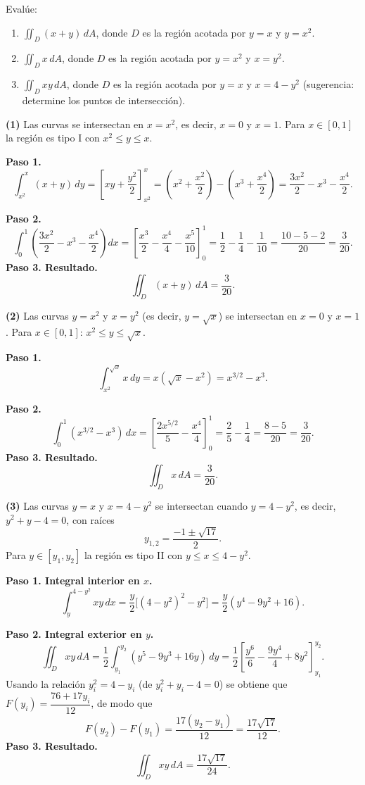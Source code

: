 \begin{prob}
Evalúe:
\begin{enumerate}
    \item $\displaystyle\iint_D (x+y)\,dA$, donde $D$ es la región acotada por $y=x$ y $y=x^2$.
    \item $\displaystyle\iint_D x\,dA$, donde $D$ es la región acotada por $y=x^2$ y $x=y^2$.
    \item $\displaystyle\iint_D xy\,dA$, donde $D$ es la región acotada por $y=x$ y $x=4-y^2$ (sugerencia: determine los puntos de intersección).
\end{enumerate}
\begin{myproof}
\textbf{(1)} Las curvas se intersectan en $x=x^2$, es decir, $x=0$ y $x=1$. Para $x\in[0,1]$ la región es tipo I con $x^2\le y\le x$.

\textbf{Paso 1.}
\[
\int_{x^2}^{x}(x+y)\,dy = \left[xy+\frac{y^2}{2}\right]_{x^2}^{x}
= \left(x^2+\frac{x^2}{2}\right)-\left(x^3+\frac{x^4}{2}\right)
= \frac{3x^2}{2}-x^3-\frac{x^4}{2}.
\]

\textbf{Paso 2.}
\[
\int_0^1\!\left(\frac{3x^2}{2}-x^3-\frac{x^4}{2}\right)dx
= \left[\frac{x^3}{2}-\frac{x^4}{4}-\frac{x^5}{10}\right]_0^1
= \frac{1}{2}-\frac{1}{4}-\frac{1}{10}
= \frac{10-5-2}{20} = \frac{3}{20}.
\]
\textbf{Paso 3. Resultado.}
\[
\boxed{\iint_D (x+y)\,dA = \frac{3}{20}.}
\]

\textbf{(2)} Las curvas $y=x^2$ y $x=y^2$ (es decir, $y=\sqrt{x}$) se intersectan en $x=0$ y $x=1$. Para $x\in[0,1]$: $x^2\le y\le\sqrt{x}$.

\textbf{Paso 1.}
\[
\int_{x^2}^{\sqrt{x}} x\,dy = x(\sqrt{x}-x^2) = x^{3/2}-x^3.
\]

\textbf{Paso 2.}
\[
\int_0^1(x^{3/2}-x^3)\,dx
= \left[\frac{2x^{5/2}}{5}-\frac{x^4}{4}\right]_0^1
= \frac{2}{5}-\frac{1}{4} = \frac{8-5}{20} = \frac{3}{20}.
\]
\textbf{Paso 3. Resultado.}
\[
\boxed{\iint_D x\,dA = \frac{3}{20}.}
\]

\textbf{(3)} Las curvas $y=x$ y $x=4-y^2$ se intersectan cuando $y=4-y^2$, es decir, $y^2+y-4=0$, con raíces
\[
y_{1,2}=\frac{-1\pm\sqrt{17}}{2}.
\]
Para $y\in[y_1,y_2]$ la región es tipo II con $y\le x\le 4-y^2$.

\textbf{Paso 1. Integral interior en $x$.}
\[
\int_{y}^{4-y^2} xy\,dx = \frac{y}{2}\bigl[(4-y^2)^2-y^2\bigr]
= \frac{y}{2}(y^4-9y^2+16).
\]

\textbf{Paso 2. Integral exterior en $y$.}
\[
\iint_D xy\,dA = \frac{1}{2}\int_{y_1}^{y_2}(y^5-9y^3+16y)\,dy
= \frac{1}{2}\left[\frac{y^6}{6}-\frac{9y^4}{4}+8y^2\right]_{y_1}^{y_2}.
\]
Usando la relación $y_i^2=4-y_i$ (de $y_i^2+y_i-4=0$) se obtiene que $F(y_i)=\dfrac{76+17y_i}{12}$, de modo que
\[
F(y_2)-F(y_1) = \frac{17(y_2-y_1)}{12} = \frac{17\sqrt{17}}{12}.
\]
\textbf{Paso 3. Resultado.}
\[
\boxed{\iint_D xy\,dA = \frac{17\sqrt{17}}{24}.}
\]
\end{myproof}
\end{prob}

